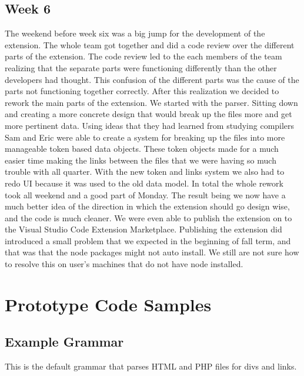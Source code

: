\documentclass[letterpaper,10pt,titlepage,draftclsnofoot,onecolumn,onesided] {IEEEtran}
\begin{document}
	\subsection{Week 6}
	The weekend before week six was a big jump for the development of the extension. 
	The whole team got together and did a code review over the different parts of the extension.
	The code review led to the each members of the team realizing that the separate parts were functioning differently than the other developers had thought. 
	This confusion of the different parts was the cause of the parts not functioning together correctly. 
	After this realization we decided to rework the main parts of the extension.
	We started with the parser. 
	Sitting down and creating a more concrete design that would break up the files more and get more pertinent data.
	Using ideas that they had learned from studying compilers Sam and Eric were able to create a system for breaking up the files into more manageable token based data objects. 
	These token objects made for a much easier time making the links between the files that we were having so much trouble with all quarter. 
	With the new token and links system we also had to redo UI because it was used to the old data model.
	In total the whole rework took all weekend and a good part of Monday.
	The result being we now have a much better idea of the direction in which the extension should go design wise, and the code is much cleaner.
	We were even able to publish the extension on to the Visual Studio Code Extension Marketplace. 
	Publishing the extension did introduced a small problem that we expected in the beginning of fall term, and that was that the node packages might not auto install. 
	We still are not sure how to resolve this on user's machines that do not have node installed.
	
\pagebreak
\section{Prototype Code Samples}
	\subsection{Example Grammar}
	This is the default grammar that parses HTML and PHP files for divs and links.
	
\end{document}
